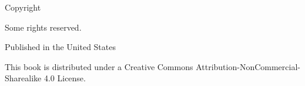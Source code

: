 \pagestyle{empty}

  \begin{center} 

  \sffamily

  \makeatletter  \small \thetitle \par \makeatother

    Copyright \ccLogo\ \makeatletter \thedate \ \theauthor \makeatother \par
    Some rights reserved. \par

    \vspace{0.4cm}

    Published in the United States

    \vspace{0.4cm}

    This book is distributed under a Creative Commons Attribution-NonCommercial-Sharealike 4.0 License. \par

    \vspace{0.4cm}

    \ccbyncsa

  \end{center}

